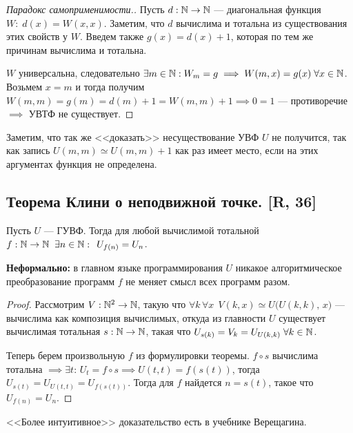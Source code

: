 \documentclass[a4paper, fleqn]{article}
\begin{document}
        \begin{proof}[Парадокс самоприменимости.]
        Пусть $d : \mathbb{N} \to \mathbb{N}$ --- диагональная функция $W: \; d(x) = W(x, x)$. Заметим, что $d$ вычислима и тотальна из существования этих свойств у $W$. Введем также $g(x) = d(x) + 1$, которая по тем же причинам вычислима и тотальна.

        $W$ универсальна, следовательно $\exists m \in \mathbb{N} : W_m = g \implies W(m, x) = g(x) \; \forall x \in \mathbb{N}$. Возьмем $x = m$ и тогда получим $W(m, m) = g(m) = d(m) + 1 = W(m, m) + 1 \implies 0 = 1$ --- противоречие $\implies$ УВТФ не существует.
        \end{proof}

        Заметим, что так же <<доказать>> несуществование УВФ $U$ не получится, так как запись $U(m, m) \simeq U(m, m) + 1$ как раз имеет место, если на этих аргументах функция не определена.

    \subsection{Теорема Клини о неподвижной точке. [R, 36]}

        \begin{theorem}
            Пусть $U$ --- ГУВФ. Тогда для любой вычислимой тотальной $f : \mathbb{N} \to \mathbb{N} \;\; \exists n \in \mathbb{N} : \;\, U_{f(n)} = U_n$.
        \end{theorem}

        \textbf{Неформально:} в главном языке программирования $U$ никакое алгоритмическое преобразование программ $f$ не меняет смысл всех программ разом.

        \begin{proof}
            Рассмотрим $V : \mathbb{N}^2 \to \mathbb{N}$, такую что $\forall k \, \forall x \;\, V(k, x) \simeq U\bigl( U(k, k), \, x \bigr)$ --- вычислима как композиция вычислимых, откуда из главности $U$ существует вычислимая тотальная $s : \mathbb{N} \to \mathbb{N}$, такая что $U_{s(k)} = V_k = U_{U(k, k)} \; \forall k \in \mathbb{N}$.

            Теперь берем произвольную $f$ из формулировки теоремы. $f \circ s$ вычислима тотальна $\implies \exists t : \, U_t = f \circ s \implies U(t, t) = f(s(t))$, тогда $U_{s(t)} = U_{U(t, t)} = U_{f(s(t))}$. Тогда для $f$ найдется $n = s(t)$, такое что $U_{f(n)} = U_n$.
        \end{proof}

        <<Более интуитивное>> доказательство есть в учебнике Верещагина.
\end{document}
